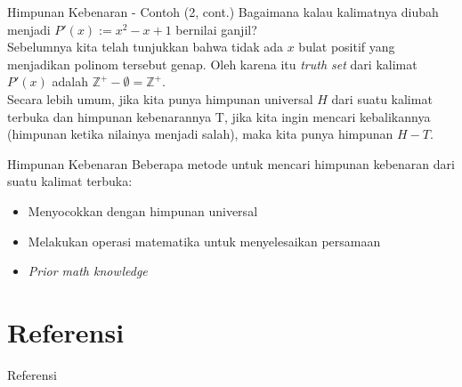 \documentclass[11pt]{beamer}
\begin{document}
\begin{frame}{Himpunan Kebenaran - Contoh (2, cont.)}
Bagaimana kalau kalimatnya diubah menjadi $P'(x) := x^2 - x + 1$ bernilai ganjil?
\pause\\

Sebelumnya kita telah tunjukkan bahwa tidak ada $x$ bulat positif yang menjadikan polinom tersebut genap. Oleh karena itu \textit{truth set} dari kalimat $P'(x)$ adalah $\mathbb{Z}^+ - \emptyset = \mathbb{Z}^+$.
\pause\\

Secara lebih umum, jika kita punya himpunan universal $H$ dari suatu kalimat terbuka dan himpunan kebenarannya T, jika kita ingin mencari kebalikannya (himpunan ketika nilainya menjadi salah), maka kita punya himpunan $
H-T$.
\end{frame}
\begin{frame}{Himpunan Kebenaran}
Beberapa metode untuk mencari himpunan kebenaran dari suatu kalimat terbuka:
\begin{itemize}
	\item Menyocokkan dengan himpunan universal
	\item Melakukan operasi matematika untuk menyelesaikan persamaan
	\item \textit{Prior math knowledge}
\end{itemize}
\end{frame}
\section{Referensi}
\begin{frame}{Referensi}


\end{frame}
\end{document}
